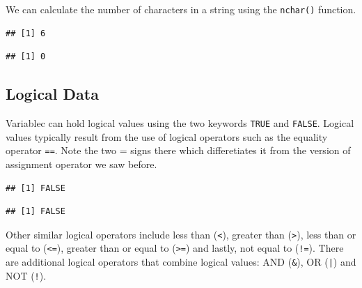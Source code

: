 \documentclass[10pt, letterpaper, twoside]{memoir}\usepackage{knitr}
\begin{document}
We can calculate the number of characters in a string using the \texttt{nchar()} function. 
\begin{knitrout}
\color{fgcolor}\begin{kframe}
\begin{alltt}
\end{alltt}
\begin{verbatim}
## [1] 6
\end{verbatim}
\begin{alltt}
\end{alltt}
\begin{verbatim}
## [1] 0
\end{verbatim}
\end{kframe}
\end{knitrout}

\subsection{Logical Data}

Variablec can hold logical values using the two keywords \texttt{TRUE} and \texttt{FALSE}.  Logical values typically result from the use of logical operators such as the equality operator \texttt{==}. Note the two = signs there which differetiates it from the version of assignment operator we saw before.

\begin{knitrout}
\color{fgcolor}\begin{kframe}
\begin{alltt}
 \hlopt{==}   
\end{alltt}
\begin{verbatim}
## [1] FALSE
\end{verbatim}
\begin{alltt}
 \hlopt{==}   
\end{alltt}
\begin{verbatim}
## [1] FALSE
\end{verbatim}
\end{kframe}
\end{knitrout}

Other similar logical operators include less than (\texttt{<}), greater than (\texttt{>}), less than or equal to (\texttt{<=}), greater than or equal to (\texttt{>=}) and lastly, not equal to (\texttt{!=}). There are additional logical operators that combine logical values: AND (\verb|&|), OR (\texttt{|}) and NOT (\texttt{!}).
\end{document}
